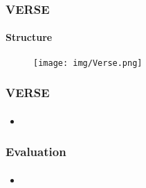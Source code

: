\documentclass{beamer}
\begin{document}
\begin{frame}
	\frametitle{VERSE}
	\framesubtitle{Structure}
	\begin{figure}
		\texttt{[image: img/Verse.png]}
	\end{figure}

\end{frame}

\begin{frame}
	\frametitle{VERSE}
	\framesubtitle{}
	\begin{itemize}
		\item 
	\end{itemize}
\end{frame}

\begin{frame}
	\frametitle{Evaluation}
	\framesubtitle{}
	\begin{itemize}
		\item 
	\end{itemize}
\end{frame}
\end{document}
